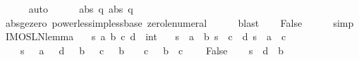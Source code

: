 \begin{isabellebody}
\ \ \ \ \isamarkupfalse%
\ auto\isanewline
\ \ \isamarkupfalse%
\ {\isachardoublequoteopen}{}\ {\isacharless}\ abs\ q{\isachardoublequoteclose}\ {\isachardoublequoteopen}abs\ q\ {\isacharless}\ {}{\isachardoublequoteclose}\isanewline
\ \ \ \ \isamarkupfalse%
\ abs{\isacharunderscore}ge{\isacharunderscore}zero\ power{\isacharunderscore}less{\isacharunderscore}imp{\isacharunderscore}less{\isacharunderscore}base\ zero{\isacharunderscore}le{\isacharunderscore}numeral\isanewline
\ \ \ \ \isamarkupfalse%
\ blast{\isacharplus}\isanewline
\ \ \isamarkupfalse%
\ False\isanewline
\ \ \ \ \isamarkupfalse%
\ simp\isanewline
{}\isamarkupfalse%
%
\endisatagproof
{\isafoldproof}%
%
\isadelimproof
\isanewline
%
\endisadelimproof
\isanewline
{}\isamarkupfalse%
\ IMO{}{}{}{}SL{\isacharunderscore}N{}{\isacharunderscore}lemma{\isacharcolon}\isanewline
\ \ \ s\ a\ b\ c\ d\ {\isacharcolon}{\isacharcolon}\ int\isanewline
\ \ \ {\isachardoublequoteopen}s{\isacharcircum}{}\ {\isacharequal}\ a{\isacharcircum}{}\ {\isacharplus}\ b{\isacharcircum}{}{\isachardoublequoteclose}\ {\isachardoublequoteopen}s{\isacharcircum}{}\ {\isacharequal}\ c{\isacharcircum}{}\ {\isacharplus}\ d{\isacharcircum}{}{\isachardoublequoteclose}\ {\isachardoublequoteopen}{}{\isacharasterisk}s\ {\isacharequal}\ a{\isacharcircum}{}\ {\isacharminus}\ c{\isacharcircum}{}{\isachardoublequoteclose}\ \isanewline
\ \ \ \ {\isachardoublequoteopen}s\ {\isachargreater}\ {}{\isachardoublequoteclose}\ {\isachardoublequoteopen}a\ {\isasymge}\ {}{\isachardoublequoteclose}\ {\isachardoublequoteopen}d\ {\isasymge}\ {}{\isachardoublequoteclose}\ {\isachardoublequoteopen}b\ {\isasymge}\ {}{\isachardoublequoteclose}\ {\isachardoublequoteopen}c\ {\isasymge}\ {}{\isachardoublequoteclose}\ {\isachardoublequoteopen}b\ {\isachargreater}\ {}\ {\isasymor}\ c\ {\isachargreater}\ {}{\isachardoublequoteclose}\ {\isachardoublequoteopen}b\ {\isasymge}\ c{\isachardoublequoteclose}\ \isanewline
\ \ \ False\isanewline
%
\isadelimproof
%
\endisadelimproof
%
\isatagproof
{}\isamarkupfalse%
{\isacharminus}\isanewline
\ \ \isamarkupfalse%
\ {\isachardoublequoteopen}{}{\isacharasterisk}s\ {\isacharequal}\ d{\isacharcircum}{}\ {\isacharminus}\ b{\isacharcircum}{}{\isachardoublequoteclose}\isanewline

\end{isabellebody}
